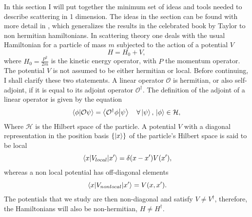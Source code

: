 In this section I will put together the minimum set of ideas and tools needed to describe scattering in 1 dimension. The ideas in the section can be found with more detail in \cite{Muga2004}, which generalizes the results in the celebrated book by Taylor \cite{Taylor1972} to non hermitian hamiltonians. In scattering theory one deals with the usual Hamiltonian for a particle of mass $m$ subjected to the action of a potential $V$
%
\begin{equation}
  H =  H_0 + V,
\end{equation}
%
where $H_0=\frac{P^2}{2m}$ is the kinetic energy operator, with $P$ the momentum operator. The potential $V$ is not assumed to be either hermitian or local. Before continuing, I shall clarify these two statements. A linear operator $\mathcal{O}$ is hermitian, or also self-adjoint, if it is equal to its adjoint operator $\mathcal{O}^\dagger$. The definition of the adjoint of a linear operator is given by the equation
%
\begin{equation}
  \braket{\phi}{\mathcal{O}\psi} = \braket{\mathcal{O}^\dagger\phi}{\psi}\quad\forall\ket{\psi},\,\ket{\phi}\in\mathcal{H},
  \label{eq:chapter1_adjointLinearOperators}
\end{equation}
%
Where $\mathcal{H}$ is the Hilbert space of the particle. A potential $V$ with a diagonal representation in the position basis $\{\ket{x}\}$ of the particle's Hilbert space is said to be local
%
\begin{equation}
  \mel{x}{V_{local}}{x'} = \delta(x-x')V(x'),
  \label{eq:chapter1_localPotential}
\end{equation}
%
whereas a non local potential has off-diagonal elements
%
\begin{equation}
  \mel{x}{V_{non local}}{x'} = V(x,x').
  \label{eq:chapter1_nonLocalPotential}
\end{equation}
%
The potentials that we study are then non-diagonal and satisfy $V \neq V^\dagger$, therefore, the Hamiltonians will also be non-hermitian, $H \neq H^\dagger$.

